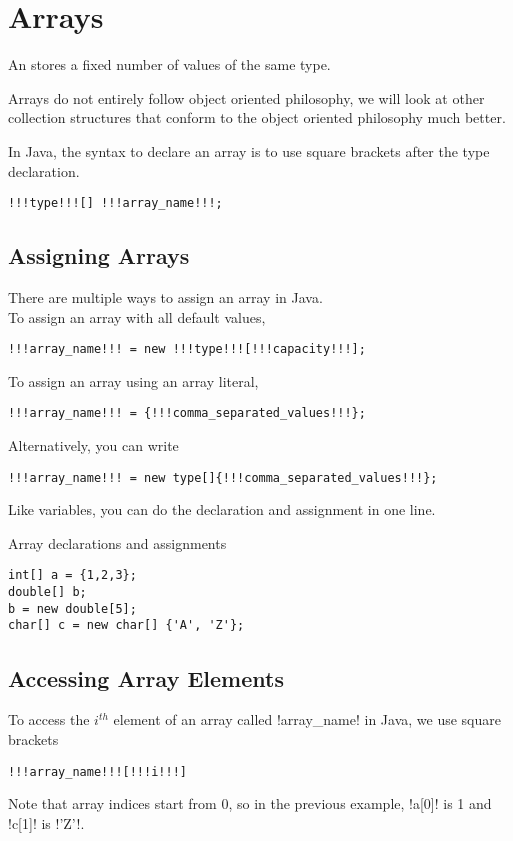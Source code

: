 \documentclass[11pt]{report}
\begin{document}
\section{Arrays}
An  stores a fixed number of values of the same type. 
\begin{note}
    Arrays do not entirely follow object oriented philosophy, we will look at other collection structures that conform to the object oriented philosophy much better.
\end{note}
\noindent In Java, the syntax to declare an array is to use square brackets after the type declaration.
\vspace{-22pt}
\begin{lstlisting}[style=javaSyntax]
!!!type!!![] !!!array_name!!!; 
\end{lstlisting}
\subsection{Assigning Arrays}
There are multiple ways to assign an array in Java. 
\vspace{5pt} \\ To assign an array with all default values,
\vspace{-22pt}
\begin{lstlisting}[style=javaSyntax]
!!!array_name!!! = new !!!type!!![!!!capacity!!!]; 
\end{lstlisting}
To assign an array using an array literal,
\vspace{-22pt}
\begin{lstlisting}[style=javaSyntax]
!!!array_name!!! = {!!!comma_separated_values!!!}; 
\end{lstlisting}
Alternatively, you can write
\vspace{-22pt}
\begin{lstlisting}[style=javaSyntax]
!!!array_name!!! = new type[]{!!!comma_separated_values!!!}; 
\end{lstlisting}
Like variables, you can do the declaration and assignment in one line.
\begin{egs} Array declarations and assignments
\vspace{-15pt}
\begin{lstlisting}
int[] a = {1,2,3};
double[] b;
b = new double[5];
char[] c = new char[] {'A', 'Z'};
\end{lstlisting}
\end{egs}
\subsection{Accessing Array Elements}
To access the $i^{th}$ element of an array called \inlineJava!array_name! in Java, we use square brackets
\vspace{-20pt}
\begin{lstlisting}[style=javaSyntax]
!!!array_name!!![!!!i!!!]
\end{lstlisting}
Note that array indices start from 0, so in the previous example, \inlineJava!a[0]! is 1 and \inlineJava!c[1]! is \inlineJava!'Z'!.
\end{document}
